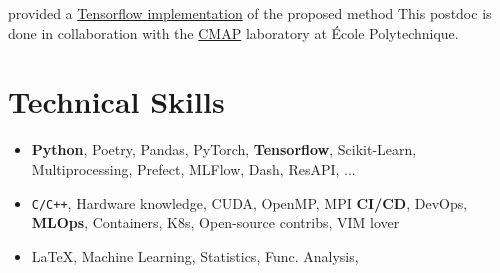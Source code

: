 \documentclass[10pt]{article} %
\begin{document}
\begin{paracol}{2}
{provided a  \href{https://bitbucket.org/RomainBrault/itl/}{Tensorflow
implementation} of the proposed method This postdoc is done in collaboration
with the \href{https://portail.polytechnique.edu/cmap/fr}{CMAP} laboratory at
\'Ecole Polytechnique.  }\par %
%
%
\section{Technical Skills}
%
%
%
%
%
%
%
\begin{itemize}[noitemsep]
  \item \textbf{Python}, Poetry, Pandas, PyTorch, \textbf{Tensorflow},
    Scikit-Learn, Multiprocessing, Prefect, MLFlow, Dash, ResAPI, ...
  \item \texttt{C/C++}, Hardware knowledge, CUDA, OpenMP, MPI \textbf{CI/CD},
    DevOps, \textbf{MLOps}, Containers, K8s, Open-source contribs, VIM
    lover
%
%
  \item \LaTeX, Machine Learning, Statistics, Func. Analysis,
\end{itemize}
%
%
%
%
%

\end{paracol}
\end{document}
